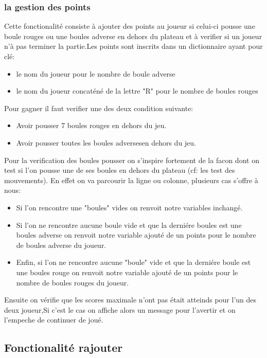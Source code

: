 \documentclass{article}
\begin{document}
\subsubsection{la gestion des points}
Cette fonctionalité consiste à ajouter des points au joueur si celui-ci pousse une boule rouges ou une boules adverse en dehors du plateau et à verifier si un joueur n'à pas terminer la partie.Les points sont inscrits dans un dictionnaire ayant pour clé:
\begin{itemize}
\item le nom du joueur pour le nombre de boule adverse
\item le nom du joueur concaténé de la lettre "R" pour le nombre de boules rouges
\end{itemize}
\vspace{0.25cm}
Pour gagner il faut verifier une des deux condition suivante:
\begin{itemize}
\item Avoir pousser 7 boules rouges en dehors du jeu.
\item Avoir pousser toutes les boules adversesen dehors du jeu.
\end{itemize}
\vspace{0.5cm}
Pour la verification des boules pousser on s'inspire fortement de la facon dont on test si l'on pousse une de ses boules en dehors du plateau (cf: les test des mouvements). En effet on va parcourir la ligne ou colonne, plusieurs cas s'offre à nous:
\begin{itemize}
\item Si l'on rencontre une "boules" vides on renvoit notre variables inchangé.
\item Si l'on ne rencontre aucune boule vide et que la derniére boules est une boules adverse on renvoit notre variable ajouté de un points pour le nombre de boules adverse du joueur.
\item Enfin, si l'on ne rencontre aucune "boule" vide et que la derniére boule est une boules rouge on renvoit notre variable ajouté de un points pour le nombre de boules rouges du joueur.
\end{itemize}
Ensuite on vérifie que les scores maximale n'ont pas était atteinds pour l'un des deux joueur,Si c'est le cas on affiche alors un message pour l'avertir et on l'empeche de continuer de joué.


\subsection{Fonctionalité rajouter}
\end{document}
